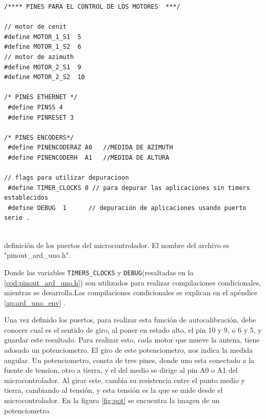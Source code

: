 \begin{listing}[ht]

	\begin{verbatim}
/**** PINES PARA EL CONTROL DE LOS MOTORES  ***/
		
// motor de cenit 
#define MOTOR_1_S1  5
#define MOTOR_1_S2  6
// motor de azimuth 
#define MOTOR_2_S1  9 
#define MOTOR_2_S2  10 
		
/* PINES ETHERNET */
 #define PINSS 4
 #define PINRESET 3  
		
/* PINES ENCODERS*/
 #define PINENCODERAZ A0   //MEDIDA DE AZIMUTH 
 #define PINENCODERH  A1   //MEDIDA DE ALTURA 
		
// flags para utilizar depuracioon 
 #define TIMER_CLOCKS 0 // para depurar las aplicaciones sin timers establecidos  
 #define DEBUG  1      // depuración de aplicaciones usando puerto serie .  
		
\end{verbatim}
	\vspace{-5mm}
	\caption{definición de los puertos del microcontrolador. El nombre del archivo es "pinout\_ard\_uno.h".}
	\label{cod:pinout_ard_uno.h} 
\end{listing}
Donde las variables \texttt{TIMERS_CLOCKS} y \texttt{DEBUG}(resaltadas en la \ref{cod:pinout_ard_uno.h}) son utilizados para realizar compilaciones condicionales, mientras se desarrolla.Las compilaciones condicionales se explican en el apéndice \ref{ap:ard_uno_env} .
 
Una vez definido los puertos, para realizar esta función de autocalibración, debe conocer cual es el sentido de giro, al poner en estado alto, el pin 10 y 9, o 6 y 5, y guardar este resultado. Para realizar esto, cada motor que mueve la antena, tiene adosado un potenciometro. El giro de este potenciometro, nos indica la medida angular. Un potenciometro, consta de tres pines, donde uno esta conectado a la fuente de tension, otro a tierra, y el del medio se dirige al pin A0 o A1 del microcontrolador. Al girar este, cambia su resistencia entre el punto medio y tierra, cambiando al tensión, y esta tensión es la que se mide desde el microcontrolador. En la figura
\ref{fig:pot} se encuentra la imagen de un potenciometro. 


